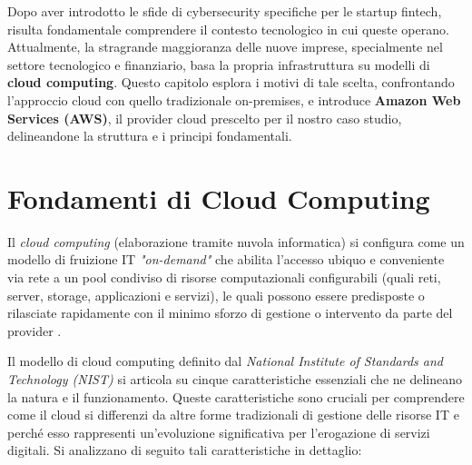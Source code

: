 Dopo aver introdotto le sfide di cybersecurity specifiche per le startup fintech, risulta fondamentale comprendere il contesto tecnologico in cui queste operano.
Attualmente, la stragrande maggioranza delle nuove imprese, specialmente nel settore tecnologico e finanziario, basa la propria infrastruttura su modelli di \textbf{cloud computing}.
Questo capitolo esplora i motivi di tale scelta, confrontando l'approccio cloud con quello tradizionale on-premises, e introduce \textbf{Amazon Web Services (AWS)}, il provider cloud prescelto per il nostro caso studio, delineandone la struttura e i principi fondamentali.

\section{Fondamenti di Cloud Computing}
Il \textit{cloud computing} (elaborazione tramite nuvola informatica) si configura come un modello di fruizione IT \textit{"on-demand"} che abilita l'accesso ubiquo e conveniente via rete a un pool condiviso di risorse computazionali configurabili (quali reti, server, storage, applicazioni e servizi), le quali possono essere predisposte o rilasciate rapidamente con il minimo sforzo di gestione o intervento da parte del provider \cite{nist800-145}.

Il modello di cloud computing definito dal \textit{National Institute of Standards and Technology (NIST)} si articola su cinque caratteristiche essenziali che ne delineano la natura e il funzionamento.
Queste caratteristiche sono cruciali per comprendere come il cloud si differenzi da altre forme tradizionali di gestione delle risorse IT e perché esso rappresenti un'evoluzione significativa per l'erogazione di servizi digitali.
Si analizzano di seguito tali caratteristiche in dettaglio:

